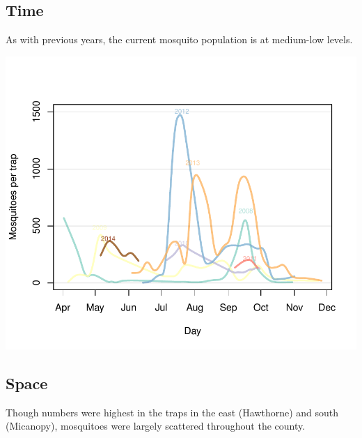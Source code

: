 \documentclass{article}
\begin{document}
\begin{multicols}{2} 



\subsection*{Time}
As with previous years, the current mosquito population is at medium-low levels.  
\begin{center}
\includegraphics{mosquitoReport-002}
\end{center}


\vfill
\columnbreak
\subsection*{Space}
Though numbers were highest in the traps in the east (Hawthorne) and south (Micanopy), mosquitoes were largely scattered throughout the county.


\end{multicols}
\end{document}

